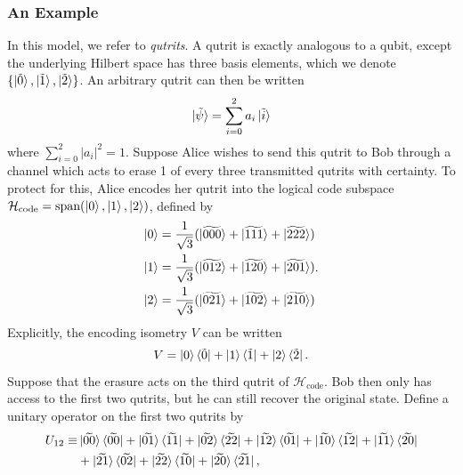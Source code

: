 \documentclass[12pt,a4paper]{report}
\numberwithin{equation}{section}
\newcommand{\ketbra}[2]{\ket{#1}\bra{#2}}
\newcommand{\ketbras}[1]{\ketbra{#1}{#1}}
\newcommand{\Hcode}{\mathcal{H}_{\text{code}}}
\theoremstyle{definition}
\theoremstyle{theorem}
\theoremstyle{theorem}
\theoremstyle{example}
\theoremstyle{definition}
\begin{document}
\subsubsection{An Example}
In this model, we refer to \textit{qutrits}. A qutrit is exactly analogous to a qubit, except the underlying Hilbert space has three basis elements, which we denote $\{\ket{\tilde{0}},\ket{\tilde{1}},\ket{\tilde{2}}\}$. An arbitrary qutrit can then be written
\begin{equation}
	\ket{\tilde{\psi}}=\sum_{i=0}^{2}a_{i}\ket{\tilde{i}}
\end{equation}
where $\sum_{i=0}^{2}|a_{i}|^{2}=1$. Suppose Alice wishes to send this qutrit to Bob through a channel which acts to erase 1 of every three transmitted qutrits with certainty. To protect for this, Alice encodes her qutrit into the logical code subspace $\Hcode=\text{span}(\ket{0},\ket{1},\ket{2})$, defined by
\begin{equation}
	\begin{aligned}
		\ket{0}&=\frac{1}{\sqrt{3}}(\ket{\widetilde{000}}+\ket{\widetilde{111}}+\ket{\widetilde{222}})\\
		\ket{1}&=\frac{1}{\sqrt{3}}(\ket{\widetilde{012}}+\ket{\widetilde{120}}+\ket{\widetilde{201}})\\
		\ket{2}&=\frac{1}{\sqrt{3}}(\ket{\widetilde{021}}+\ket{\widetilde{102}}+\ket{\widetilde{210}})
	\end{aligned}.
\end{equation}
Explicitly, the encoding isometry $V$ can be written
\begin{equation}
	V=\ket{0}\bra{\tilde{0}}+\ket{1}\bra{\tilde{1}}+\ket{2}\bra{\tilde{2}}.
\end{equation}
Suppose that the erasure acts on the third qutrit of $\Hcode$. Bob then only has access to the first two qutrits, but he can still recover the original state. Define a unitary operator on the first two qutrits by
\begin{equation}\label{unitary}
	\begin{aligned}
		U_{12}\equiv&\ketbras{\widetilde{00}}+\ketbra{\widetilde{01}}{\widetilde{11}}+\ketbra{\widetilde{02}}{\widetilde{22}}+\ketbra{\widetilde{12}}{\widetilde{01}}+\ketbra{\widetilde{10}}{\widetilde{12}}+\ketbra{\widetilde{11}}{\widetilde{20}}\\&+\ketbra{\widetilde{21}}{\widetilde{02}}+\ketbra{\widetilde{22}}{\widetilde{10}}+\ketbra{\widetilde{20}}{\widetilde{21}},
	\end{aligned}
\end{equation}
\end{document}
